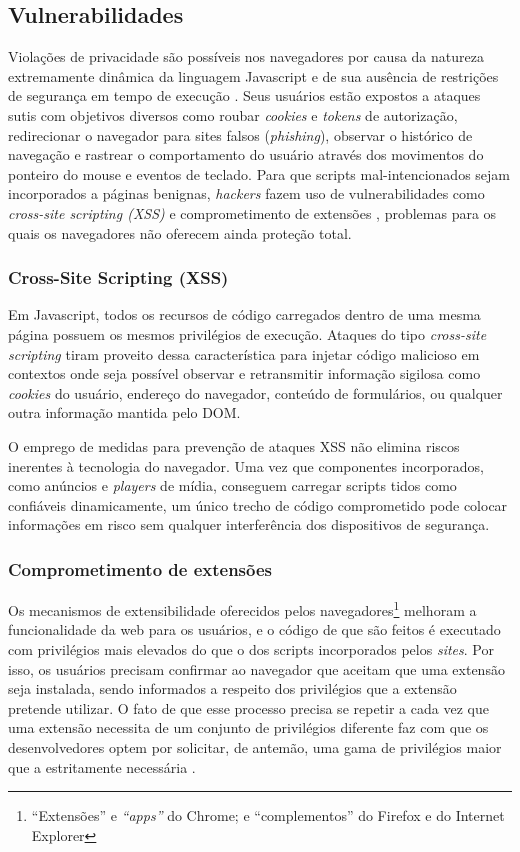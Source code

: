 \subsection{Vulnerabilidades}

Violações de privacidade são possíveis nos navegadores por causa da natureza extremamente dinâmica da linguagem Javascript e de sua ausência de restrições de segurança em tempo de execução \cite{Jang2010}. Seus usuários estão expostos a ataques sutis com objetivos diversos como roubar \textit{cookies} e \textit{tokens} de autorização, redirecionar o navegador para sites falsos (\textit{phishing}), observar o histórico de navegação e rastrear o comportamento do usuário através dos movimentos do ponteiro do mouse e eventos de teclado. Para que scripts mal-intencionados sejam incorporados a páginas benignas, \textit{hackers} fazem uso de vulnerabilidades como \textit{cross-site scripting (XSS)} \cite{OWASP:XSS} e comprometimento de extensões \cite{Heule2015_Most_Dangerous_Code}, problemas para os quais os navegadores não oferecem ainda proteção total.

\subsubsection{Cross-Site Scripting (XSS)}
Em Javascript, todos os recursos de código carregados dentro de uma mesma página possuem os mesmos privilégios de execução. Ataques do tipo \textit{cross-site scripting} tiram proveito dessa característica para injetar código malicioso em contextos onde seja possível observar e retransmitir informação sigilosa como \textit{cookies} do usuário, endereço do navegador, conteúdo de formulários, ou qualquer outra informação mantida pelo DOM.

O emprego de medidas para prevenção de ataques XSS \cite{OWASP:XSS-CheatSheet} não elimina riscos inerentes à tecnologia do navegador. Uma vez que componentes incorporados, como anúncios e \textit{players} de mídia, conseguem carregar scripts tidos como confiáveis dinamicamente, um único trecho de código comprometido pode colocar informações em risco sem qualquer interferência dos dispositivos de segurança.

\subsubsection{Comprometimento de extensões}

Os mecanismos de extensibilidade oferecidos pelos navegadores\footnote{``Extensões'' e \textit{``apps''} do Chrome; e ``complementos'' do Firefox e do Internet Explorer} melhoram a funcionalidade da web para os usuários, e o código de que são feitos é executado com privilégios mais elevados do que o dos scripts incorporados pelos \textit{sites}. Por isso, os usuários precisam confirmar ao navegador que aceitam que uma extensão seja instalada, sendo informados a respeito dos privilégios que a extensão pretende utilizar. O fato de que esse processo precisa se repetir a cada vez que uma extensão necessita de um conjunto de privilégios diferente faz com que os desenvolvedores optem por solicitar, de antemão, uma gama de privilégios maior que a estritamente necessária \cite{Heule2015_Most_Dangerous_Code}.

